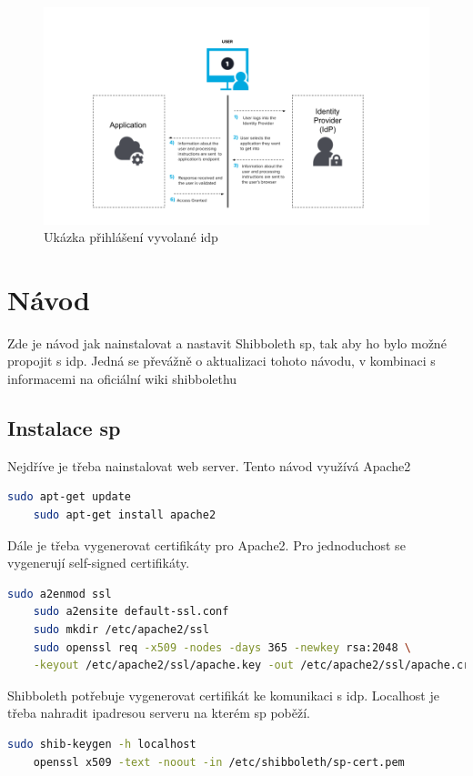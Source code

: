 \begin{figure}[bp]
	\centering
    \includegraphics[width=1.2\textwidth]{obrazky-figures/saml-idp.png}
	\caption{Ukázka přihlášení vyvolané idp\cite{SAMLxOIDC}}
	\label{saml-flow}
\end{figure}
\chapter{Návod}
\label{návod}

Zde je návod jak nainstalovat a nastavit Shibboleth sp, tak aby ho bylo možné propojit s idp. Jedná se převážně o aktualizaci tohoto návodu\cite{shibbolethSpInstallation}, v kombinaci s informacemi na oficiální wiki shibbolethu\cite{shibbolethWikiSP}

\section{Instalace sp}

Nejdříve je třeba nainstalovat web server. Tento návod využívá Apache2
\begin{lstlisting}[language=Bash]
    sudo apt-get update
    sudo apt-get install apache2
\end{lstlisting}

Dále je třeba vygenerovat certifikáty pro Apache2. Pro jednoduchost se vygenerují self-signed certifikáty.
\begin{lstlisting}[language=Bash]
    sudo a2enmod ssl
    sudo a2ensite default-ssl.conf
    sudo mkdir /etc/apache2/ssl
    sudo openssl req -x509 -nodes -days 365 -newkey rsa:2048 \
    -keyout /etc/apache2/ssl/apache.key -out /etc/apache2/ssl/apache.crt
\end{lstlisting}

Shibboleth potřebuje vygenerovat certifikát ke komunikaci s idp. Localhost je třeba nahradit ipadresou serveru na kterém sp poběží.
\begin{lstlisting}[language=Bash]
    sudo shib-keygen -h localhost
    openssl x509 -text -noout -in /etc/shibboleth/sp-cert.pem
\end{lstlisting}

